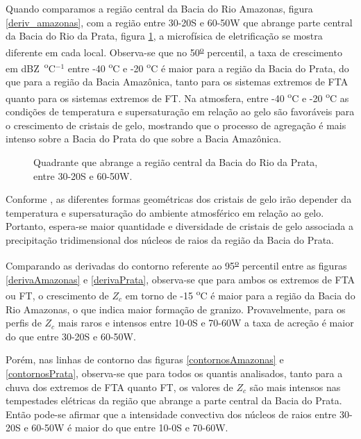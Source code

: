 Quando comparamos a região central da Bacia do Rio Amazonas, figura \ref{deriv_amazonas}, com a região entre 30-20S e 60-50W que abrange parte central da Bacia do Rio da Prata, figura \ref{deriv_prata}, a microfísica de eletrificação se mostra diferente em cada local. Observa-se que no 50\textsuperscript{\underline{o}} percentil, a taxa de crescimento em dBZ~\textsuperscript{o}C$^{-1}$ entre -40 \textsuperscript{o}C e -20 \textsuperscript{o}C é maior para a região da Bacia do Prata, do que para a região da Bacia Amazônica, tanto para os sistemas extremos de FTA quanto para os sistemas extremos de FT. Na atmosfera, entre -40 \textsuperscript{o}C e -20 \textsuperscript{o}C as condições de temperatura e supersaturação em relação ao gelo são favoráveis para o crescimento de cristais de gelo, mostrando que o processo de agregação é mais intenso sobre a Bacia do Prata do que sobre a Bacia Amazônica.


\begin{figure}[!ht]
\centering
{}
\caption{Quadrante que abrange a região central da Bacia do Rio da Prata, entre 30-20S e 60-50W.}
\label{deriv_prata}
\end{figure}


Conforme , as diferentes formas geométricas dos cristais de gelo irão depender da temperatura e supersaturação do ambiente atmosférico em relação ao gelo. Portanto, espera-se maior quantidade e diversidade de cristais de gelo associada a precipitação tridimensional dos núcleos de raios  da região da Bacia do Prata.

Comparando as derivadas do contorno referente ao 95\textsuperscript{\underline{o}} percentil entre as figuras \ref{derivaAmazonas} e \ref{derivaPrata}, observa-se que para ambos os extremos de FTA ou FT, o crescimento de $Z_c$ em torno de -15 \textsuperscript{o}C é maior para a região da Bacia do Rio Amazonas, o que indica maior formação de granizo. Provavelmente, para os perfis de $Z_c$ mais raros e intensos entre 10-0S e 70-60W a taxa de acreção é maior do que entre 30-20S e 60-50W. 

Porém, nas linhas de contorno das figuras \ref{contornosAmazonas} e \ref{contornosPrata}, observa-se que para todos os quantis analisados, tanto para a chuva dos extremos de FTA quanto FT, os valores de $Z_c$ são mais intensos nas tempestades elétricas da região que abrange a parte central da Bacia do Prata. Então pode-se afirmar que a intensidade convectiva dos núcleos de raios entre 30-20S e 60-50W é maior do que entre 10-0S e 70-60W. 

